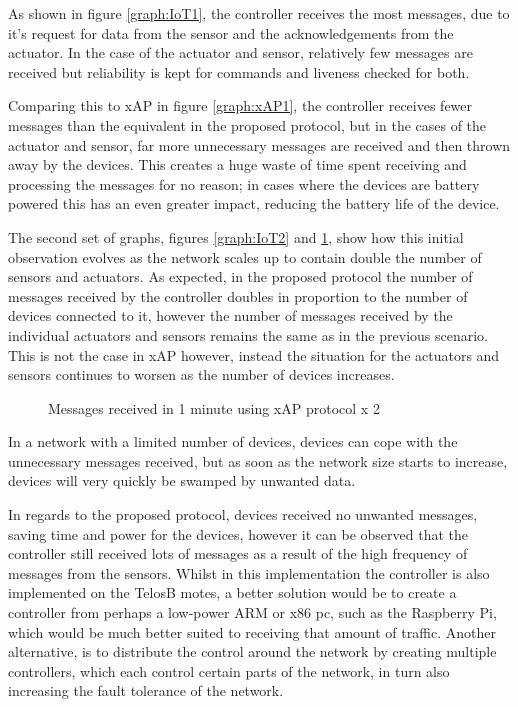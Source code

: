 As shown in figure \ref{graph:IoT1}, the controller receives the most messages, due to it's request for data from the sensor and the acknowledgements from the actuator. In the case of the actuator and sensor, relatively few messages are received but reliability is kept for commands and liveness checked for both. 

Comparing this to xAP in figure \ref{graph:xAP1}, the controller receives fewer messages than the equivalent in the proposed protocol, but in the cases of the actuator and sensor, far more unnecessary messages are received and then thrown away by the devices. This creates a huge waste of time spent receiving and processing the messages for no reason; in cases where the devices are battery powered this has an even greater impact, reducing the battery life of the device.

The second set of graphs, figures \ref{graph:IoT2} and \ref{graph:xAP2}, show how this initial observation evolves as the network scales up to contain double the number of sensors and actuators. As expected, in the proposed protocol the number of messages received by the controller doubles in proportion to the number of devices connected to it, however the number of messages received by the individual actuators and sensors remains the same as in the previous scenario. This is not the case in xAP however, instead the situation for the actuators and sensors continues to worsen as the number of devices increases.
\begin{figure}[h]
\begin{center}
\begin{minipage}{.5\textwidth}

\caption{Messages received in 1 minute using IoT protocol x 2}
\label{graph:IoT2}
\end{minipage}%
\begin{minipage}{.5\textwidth}

\caption{Messages received in 1 minute using xAP protocol x 2}
\label{graph:xAP2}
\end{minipage}
\end{center}
\end{figure}

In a network with a limited number of devices, devices can cope with the unnecessary messages received, but as soon as the network size starts to increase, devices will very quickly be swamped by unwanted data.

In regards to the proposed protocol, devices received no unwanted messages, saving time and power for the devices, however it can be observed that the controller still received lots of messages as a result of the high frequency of messages from the sensors. Whilst in this implementation the controller is also implemented on the TelosB motes, a better solution would be to create a controller from perhaps a low-power ARM or x86 pc, such as the Raspberry Pi, which would be much better suited to receiving that amount of traffic. Another alternative, is to distribute the control around the network by creating multiple controllers, which each control certain parts of the network, in turn also increasing the fault tolerance of the network.

